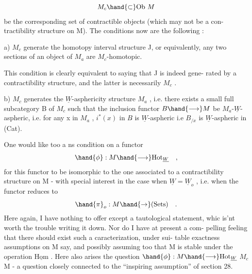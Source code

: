 
\[ M_c \hand{\subset} \text{Ob } M \]
be the corresponding set of contractible objects (which may not be a con-%
tractibility structure on M). The conditions now are the following :

a) $M_c$ generate the homotopy interval structure J, or equivalently,
any two sections of an object of $M_a$ are $M_c$-homotopic.

This condition is clearly equivalent to saying that J is indeed gene-%
rated by a contractibility structure, and the latter is necessarily $M_c$ .

b) $M_c$ generates the $\underline{W}$-asphericity structure $M_a$ , i.e. there exists
a small full subcategory B of $M_c$ such that the inclusion functor $B \hand{\longrightarrow} M$
be  $M_a$-$\underline{W}$-aspheric, i.e. for any x in $M_a$ , $i^*(x)$ in $B\hat{}$ is $\underline{W}$-aspheric \hand{(}i.e
$B_{/x}$ is $\underline{W}$-aspheric in (Cat)\hand{)}.

One would like too a ns condition on a functor
\[ \hand{\phi} : M \hand{\longrightarrow} \text{Hot}_{\underline{W}} \quad , \]
for this functor to be  isomorphic to the one associated to a
contractibility structure on M - with special interest in the case when
$\underline{W} = \underline{W}_o$ , i.e. when the functor reduces to 
\[ \hand{\pi}_o : M \hand{\to} (\text{Sets}) \quad . \]
Here again, I have nothing to offer except a tautological statement, whic
is'nt worth the trouble writing it down. Nor do I have at present a com-%
pelling feeling that there should exist such a caracterization, under sui-%
table exactness assumptions on M say, and possibly assuming too that M is
stable under the operation $\underline{\text{Hom}}$ . Here also arises the question \hand{\uline{\textcolor{black}{whether a}}}
\hand{\uline{\textcolor{black}{functor}}} $\hand{\phi} : M \hand{\longrightarrow} \text{Hot}_{\underline{W}}$ \hand{\uline{\textcolor{black}{stemming from a contractibility structure}}} $M_c$ \hand{\uline{\textcolor{black}{on}}} M%
\hand{\uline{\textcolor{black}{can have non trivial automorphisms}}} - a question closely connected to the
``inspiring assumption'' of section 28.

